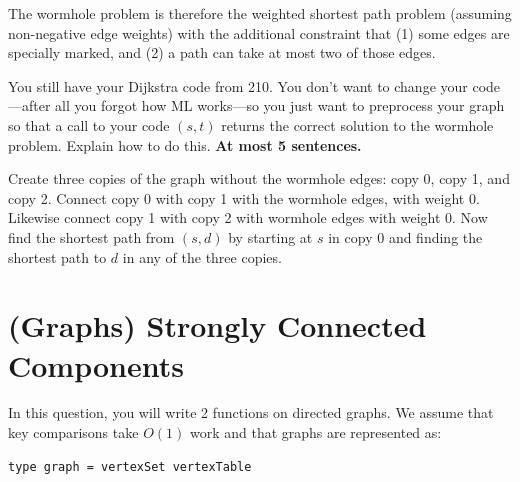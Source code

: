 \begin{problem}
The wormhole problem is therefore the weighted shortest path problem
(assuming non-negative edge weights) with the additional constraint
that (1) some edges are specially marked, and (2) a path can take at
most two of those edges.

\ask
You still have your Dijkstra code from 210.  You don't want to change
your code---after all you forgot how ML works---so you just want to
preprocess your graph so that a call to your code $(s,t)$
returns the correct solution to the wormhole problem.  Explain how to
do this. \textbf{At most 5 sentences.}

\sol
Create three copies of the graph without the wormhole edges: copy 0,
copy 1, and copy 2.  Connect copy 0 with copy 1 with the wormhole
edges, with weight 0.  Likewise connect copy 1 with copy 2 with
wormhole edges with weight 0.  Now find the shortest path from
$(s,d)$ by starting at $s$ in copy 0 and finding the shortest
path to $d$ in any of the three copies.
\end{problem}





%

\section{(Graphs) Strongly Connected Components}


In this question, you will write 2 functions on directed graphs.
We assume that key comparisons take $O(1)$ work  and  that graphs are represented as:
\begin{lstlisting}[language=caml, numbers=none]
type graph = vertexSet vertexTable
\end{lstlisting}


